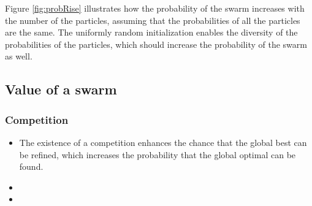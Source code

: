 Figure \ref{fig:probRise} illustrates how the probability of the swarm increases with the number of the particles, assuming that the probabilities of all the particles are the same.
The uniformly random initialization enables the diversity of the probabilities of the particles, which should increase the probability of the swarm as well.



\subsection{Value of a swarm}




\subsubsection{Competition}

\begin{itemize}
\item The existence of a competition enhances the chance that the global best can be refined, which increases the probability that the global optimal can be found.
\item 
\item 
\end{itemize}

